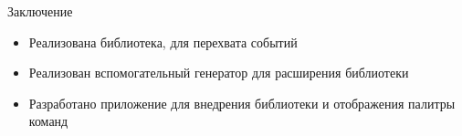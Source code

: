 \documentclass[aspectratio=1610]{beamer}
\begin{document}
\begin{frame}{Заключение}
	\begin{itemize}
		\item Реализована библиотека, для перехвата событий
		\item Реализован вспомогательный генератор для расширения библиотеки
		\item Разработано приложение для внедрения библиотеки и отображения палитры команд
	\end{itemize}
\end{frame}

\begin{frame}[plain]
	\titlepage
\end{frame}
\end{document}
